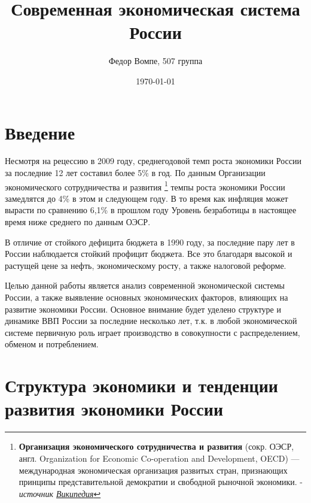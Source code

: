 \documentclass[a4paper,12pt]{article}
\title{Современная экономическая система России} %
\author{Федор Вомпе, 507 группа}
\date{\today} %
\begin{document}
\maketitle

\section{Введение}

Несмотря на рецессию в 2009 году, среднегодовой темп роста экономики России за
последние 12 лет составил более 5\% в год\cite{TheEconomist}. По данным
Организации экономического сотрудничества и развития 
\footnote{ \textbf{Организация экономического сотрудничества
и развития} (сокр. ОЭСР, англ. Organization for Economic Co-operation and
Development, OECD) — международная экономическая организация развитых стран,
признающих принципы представительной демократии и свободной рыночной экономики.
- \textit{источник
\href{http://ru.wikipedia.org/wiki/Организация экономического сотрудничества
и развития}{Википедия}} } темпы роста экономики России замедлятся 
до 4\% в этом и следующем году\cite{StandardPoor}. В то время как инфляция может
вырасти по сравнению 6,1\% в прошлом году
Уровень безработицы в настоящее время ниже среднего по данным ОЭСР.

В отличие от стойкого дефицита бюджета в 1990 году, за последние пару лет
в России наблюдается стойкий профицит бюджета. Все это благодаря
высокой и растущей цене за нефть, экономическому росту, а также
налоговой реформе.

Целью данной работы является анализ современной экономической
системы России, а также выявление основных экономических факторов, влияющих на
развитие экономики России. Основное внимание будет уделено структуре и динамике
ВВП России за последние несколько лет, т.к. в любой экономической системе
первичную роль играет производство в совокупности с распределением, обменом и потреблением.

\section{Структура экономики и тенденции развития экономики России}
\end{document}
